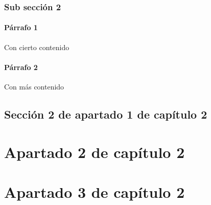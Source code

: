 \subsubsection{Sub sección 2}

\paragraph{Párrafo 1} Con cierto contenido

\paragraph{Párrafo 2} Con más contenido

\subsection{Sección 2 de apartado 1 de capítulo 2}

\section{Apartado 2 de capítulo 2}

\section{Apartado 3 de capítulo 2}
